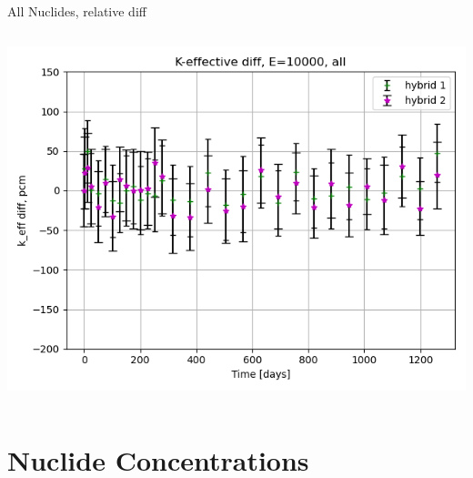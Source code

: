 \documentclass[
	11pt, %
	aspectratio=169, %
]{beamer}
\begin{document}
\begin{frame}{All Nuclides, relative diff}
\begin{columns}[c]
\begin{column}{0.39\textwidth}
			\includegraphics[width=\textwidth]{../figures/keff/keff_all_10000_diff.png}
		\end{column}
	\end{columns}
\end{frame}


\section{Nuclide Concentrations}
\end{document}
